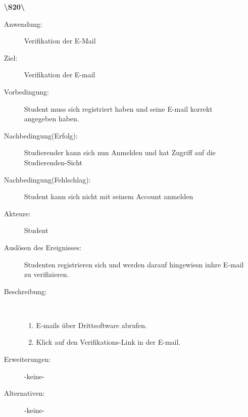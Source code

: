 \documentclass[parskip=full]{scrartcl}
\begin{document}
\begin{enumerate}
  \item[\textbf{\textbackslash S20\textbackslash}] \begin{description}
    \item[Anwendung:] Verifikation der E-Mail
    \item[Ziel:] Verifikation der E-mail
    \item[Vorbedingung:] Student muss sich registriert haben und seine E-mail
    korrekt angegeben haben.
    \item[Nachbedingung(Erfolg):] Studierender kann sich nun Anmelden und hat
    Zugriff auf die Studierenden-Sicht
    \item[Nachbedingung(Fehlschlag):] Student kann sich nicht mit seinem Account
    anmelden
    \item[Akteure:] Student
    \item[Auslösen des Ereignisses:] Studenten registrieren sich und werden
    darauf hingewiesn inhre E-mail zu verifizieren.
    \item[Beschreibung:]~
    \begin{enumerate}[1.]
      \item E-mails über Drittsoftware abrufen.
      \item Klick auf den Verifikations-Link in der E-mail.      
    \end{enumerate}
    \item[Erweiterungen:] -keine-
    \item[Alternativen:] -keine-
      \end{description}
  \pagebreak
  

\end{enumerate}
\end{document}
